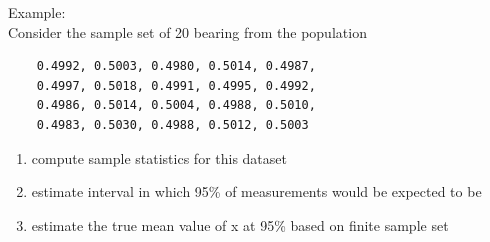 \documentclass[fleqn]{ltx-talk} %
\begin{document}
    \begin{frame*}
    Example: \vspace{5mm}\\

    Consider the sample set of 20 bearing from the population
    \begin{verbatim}
    0.4992, 0.5003, 0.4980, 0.5014, 0.4987, 
    0.4997, 0.5018, 0.4991, 0.4995, 0.4992,  
    0.4986, 0.5014, 0.5004, 0.4988, 0.5010, 
    0.4983, 0.5030, 0.4988, 0.5012, 0.5003
    \end{verbatim} 
    
    \begin{enumerate}

      \item compute sample statistics for this dataset
      \item estimate interval in which 95\% of measurements would be expected to be
      \item estimate the true mean value of x at 95\% based on finite sample set

    \end{enumerate}

    \end{frame*}
\end{document}
